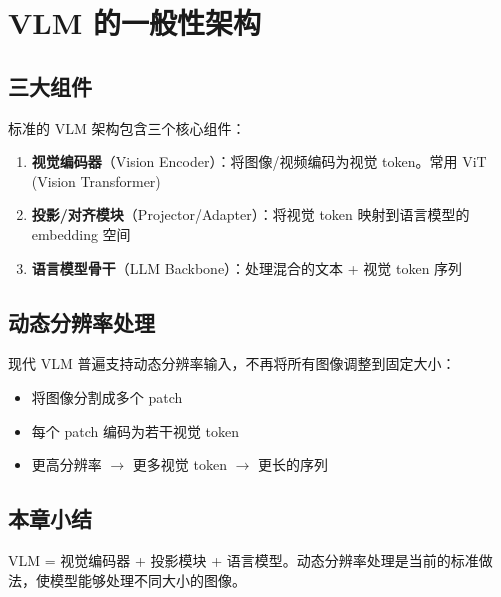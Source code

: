 \section{VLM 的一般性架构}

\subsection{三大组件}

标准的 VLM 架构包含三个核心组件：

\begin{enumerate}
  \item \textbf{视觉编码器}（Vision Encoder）：将图像/视频编码为视觉 token。常用 ViT (Vision Transformer)
  \item \textbf{投影/对齐模块}（Projector/Adapter）：将视觉 token 映射到语言模型的 embedding 空间
  \item \textbf{语言模型骨干}（LLM Backbone）：处理混合的文本 + 视觉 token 序列
\end{enumerate}

\subsection{动态分辨率处理}

现代 VLM 普遍支持动态分辨率输入，不再将所有图像调整到固定大小：
\begin{itemize}
  \item 将图像分割成多个 patch
  \item 每个 patch 编码为若干视觉 token
  \item 更高分辨率 $\to$ 更多视觉 token $\to$ 更长的序列
\end{itemize}

\subsection{本章小结}

VLM = 视觉编码器 + 投影模块 + 语言模型。动态分辨率处理是当前的标准做法，使模型能够处理不同大小的图像。

